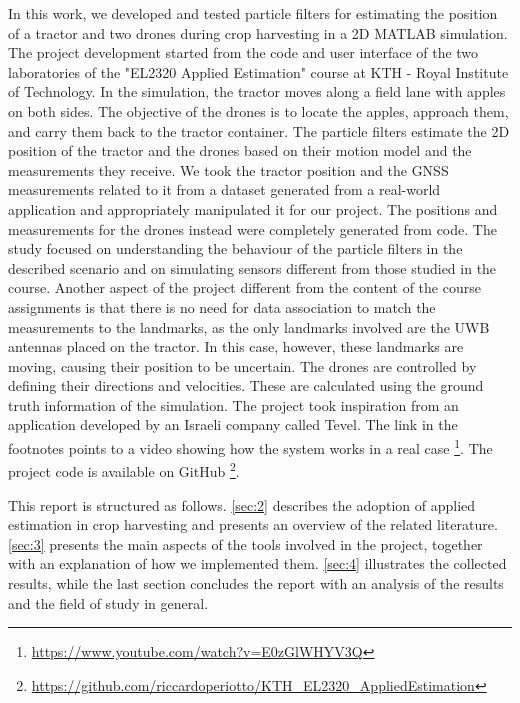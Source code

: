 \documentclass[letterpaper,twocolumn,10pt]{article}
\begin{document}
In this work, we developed and tested particle filters for estimating the position of a tractor and two drones during crop harvesting in a 2D MATLAB simulation. The project development started from the code and user interface of the two laboratories of the "EL2320 Applied Estimation" course at KTH - Royal Institute of Technology. 
In the simulation, the tractor moves along a field lane with apples on both sides. The objective of the drones is to locate the apples, approach them, and carry them back to the tractor container. The particle filters estimate the 2D position of the tractor and the drones based on their motion model and the measurements they receive. We took the tractor position and the GNSS measurements related to it from a dataset generated from a real-world application and appropriately manipulated it for our project. The positions and measurements for the drones instead were completely generated from code.
The study focused on understanding the behaviour of the particle filters in the described scenario and on simulating sensors different from those studied in the course. Another aspect of the project different from the content of the course assignments is that there is no need for data association to match the measurements to the landmarks, as the only landmarks involved are the UWB antennas placed on the tractor. In this case, however, these landmarks are moving, causing their position to be uncertain. 
The drones are controlled by defining their directions and velocities. These are calculated using the ground truth information of the simulation. The project took inspiration from an application developed by an Israeli company called Tevel. The link in the footnotes points to a video showing how the system works in a real case \footnote{\url{https://www.youtube.com/watch?v=E0zGlWHYV3Q}}. The project code is available on GitHub \footnote{\url{https://github.com/riccardoperiotto/KTH_EL2320_AppliedEstimation}}. 

This report is structured as follows. \autoref{sec:2} describes the adoption of applied estimation in crop harvesting and presents an overview of the related literature. \autoref{sec:3} presents the main aspects of the tools involved in the project, together with an explanation of how we implemented them. \autoref{sec:4} illustrates the collected results, while the last section concludes the report with an analysis of the results and the field of study in general.
\end{document}
